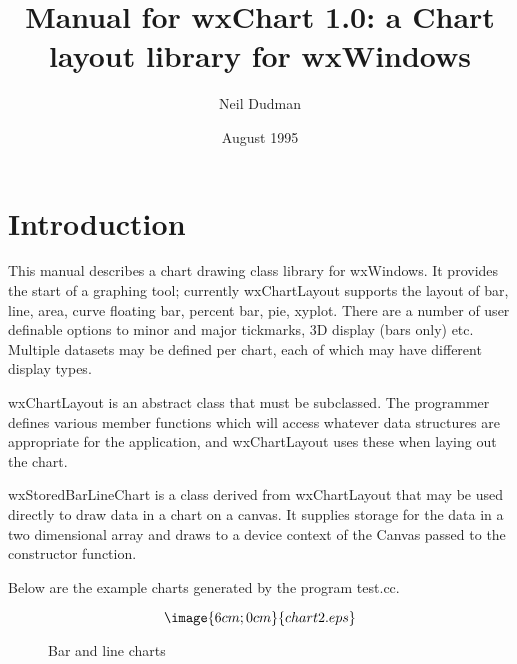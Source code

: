 %

\parskip=10pt%
\title{Manual for wxChart 1.0: a Chart layout library for wxWindows}
\author{Neil Dudman}
\date{August 1995}%
\makeindex%
%
\maketitle

\pagestyle{fancyplain}

\setfooter{\thepage}{}{}{}{}{\thepage}
\tableofcontents%

\chapter{Introduction}
%
%
\setfooter{\thepage}{}{}{}{}{\thepage}


This manual describes a chart drawing class library for wxWindows.  It
provides the start of a graphing tool; currently wxChartLayout supports
the layout of bar, line, area, curve floating bar, percent bar, pie,
xyplot. There are a number of user definable options to minor and major
tickmarks, 3D display (bars only) etc. Multiple datasets may be defined
per chart, each of which may have different display types. 

wxChartLayout is an abstract class that must be subclassed. The programmer
defines various member functions which will access whatever data structures
are appropriate for the application, and wxChartLayout uses these when laying
out the chart.

wxStoredBarLineChart is a class derived from wxChartLayout that may be
used directly to draw data in a chart on a canvas. It supplies storage
for the data in a two dimensional array and draws to a device context of
the Canvas passed to the constructor function. 

Below are  the example charts generated by the program test.cc.

%
%
\begin{figure}
$$\image{6cm;0cm}{chart2.eps}$$
\caption{Bar and line charts}
\end{figure}


